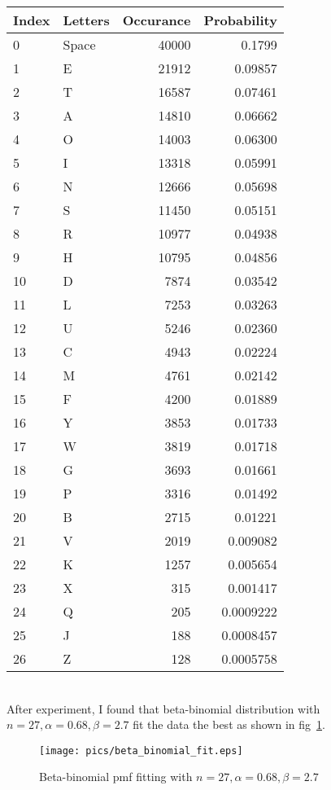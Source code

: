 \documentclass{assignment}
\begin{document}
\begin{enumerate}
\begin{enumerate}
    \begin{tabular}[h]{l|l|r|r}
      Index & Letters & Occurance & Probability\\
      \hline
      0     & Space   & 40000 & 0.1799\\
      1     & E       & 21912 & 0.09857\\
      2     & T       & 16587 & 0.07461\\
      3     & A       & 14810 & 0.06662\\
      4     & O       & 14003 & 0.06300\\
      5     & I       & 13318 & 0.05991\\
      6     & N       & 12666 & 0.05698\\
      7     & S       & 11450 & 0.05151\\
      8     & R       & 10977 & 0.04938\\
      9     & H       & 10795 & 0.04856\\
      10    & D       & 7874  & 0.03542\\
      11    & L       & 7253  & 0.03263\\
      12    & U       & 5246  & 0.02360\\
      13    & C       & 4943  & 0.02224\\
      14    & M       & 4761  & 0.02142\\
      15    & F       & 4200  & 0.01889\\
      16    & Y       & 3853  & 0.01733\\
      17    & W       & 3819  & 0.01718\\
      18    & G       & 3693  & 0.01661\\
      19    & P       & 3316  & 0.01492\\
      20    & B       & 2715  & 0.01221\\
      21    & V       & 2019  & 0.009082\\
      22    & K       & 1257  & 0.005654\\
      23    & X       & 315   & 0.001417\\
      24    & Q       & 205   & 0.0009222\\
      25    & J       & 188   & 0.0008457\\
      26    & Z       & 128   & 0.0005758
    \end{tabular} \\

    After experiment, I found that beta-binomial distribution with $n=27, \alpha=0.68, \beta=2.7$ fit the data the best
    as shown in fig~\ref{fig:beta-binomial-fit}.
    \begin{figure}[!h]
      \centering
      \texttt{[image: pics/beta\_binomial\_fit.eps]}
      \caption{Beta-binomial pmf fitting with $n=27, \alpha=0.68, \beta=2.7$}
      \label{fig:beta-binomial-fit}
    \end{figure}


\end{enumerate}
\end{enumerate}
\end{document}
